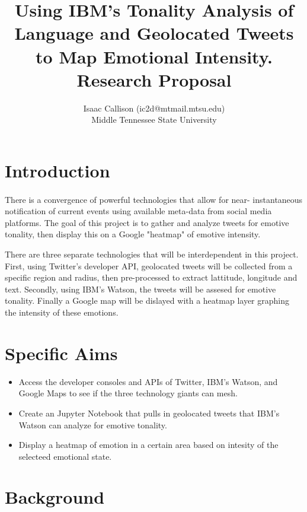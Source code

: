 \documentclass[12pt, oneside]{article}
\title{Using IBM's Tonality Analysis of Language and Geolocated Tweets to Map Emotional Intensity.
\\\medskip Research Proposal}
\author{Isaac Callison (ic2d@mtmail.mtsu.edu)\\Middle Tennessee State University}
\begin{document}
\maketitle
\nocite{*}
\newpage{}

\section{Introduction}
\paragraph{}
There is a convergence of powerful technologies that allow for near-
instantaneous notification of current events using available meta-data from
social media platforms. The goal of this project is to gather and analyze
tweets for emotive tonality, then display this on a Google "heatmap" of emotive
intensity.

There are three separate technologies that will be interdependent in this
project. First, using Twitter's developer API, geolocated tweets will be
collected from a specific region and radius, then pre-processed to extract
lattitude, longitude and text. Secondly, using IBM's Watson, the tweets will be
assesed for emotive tonality. Finally a Google map will be dislayed with a
heatmap layer graphing the intensity of these emotions.


\section{Specific Aims}
\begin{itemize}
 \item Access the developer consoles and APIs of Twitter, IBM's Watson, and Google Maps to see if the three technology giants can mesh.

 \item Create an Jupyter Notebook that pulls in geolocated tweets that IBM's Watson can analyze for emotive tonality.

 \item Display a heatmap of emotion in a certain area based on intesity of the selecteed emotional state.

\end{itemize}

\section{Background}
\end{document}
